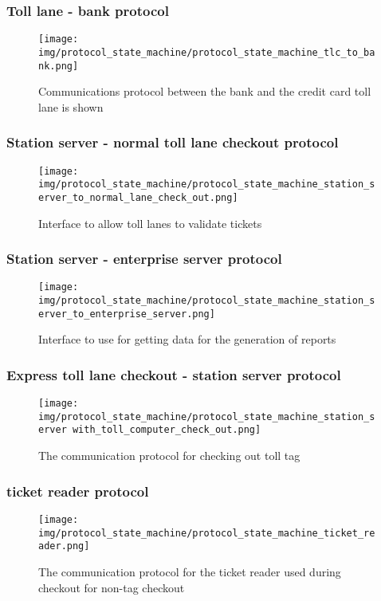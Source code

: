 \subsubsection*{Toll lane - bank protocol}
\begin{figure}
\centering
\texttt{[image: img/protocol\_state\_machine/protocol\_state\_machine\_tlc\_to\_bank.png]}
\caption{Communications protocol between the bank and the credit card toll lane is shown}
\label{fig:protocol_state_machine_tlc_to_bank}
\end{figure}

\subsubsection*{Station server - normal toll lane checkout protocol}
\begin{figure}
\centering
\texttt{[image: img/protocol\_state\_machine/protocol\_state\_machine\_station\_server\_to\_normal\_lane\_check\_out.png]}
\caption{Interface to allow toll lanes to validate tickets}
\label{fig:protocol_state_machine_station_server_to_normal_lane_check_out}
\end{figure}

\subsubsection*{Station server - enterprise server protocol}
\begin{figure}
\centering
\texttt{[image: img/protocol\_state\_machine/protocol\_state\_machine\_station\_server\_to\_enterprise\_server.png]}
\caption{Interface to use for getting data for the generation of reports}
\label{fig:protocol_state_machine_station_server_to_enterprise_server}
\end{figure}

\subsubsection*{Express toll lane checkout - station server protocol}
\begin{figure}
\centering
\texttt{[image: img/protocol\_state\_machine/protocol\_state\_machine\_station\_server with\_toll\_computer\_check\_out.png]}
\caption{The communication protocol for checking out toll tag}
\label{fig:protocol_state_machine_station_server with_toll_computer_check_out}
\end{figure}

\subsubsection*{ticket reader protocol}
\begin{figure}
\centering
\texttt{[image: img/protocol\_state\_machine/protocol\_state\_machine\_ticket\_reader.png]}
\caption{The communication protocol for the ticket reader used during checkout for non-tag checkout}
\label{fig:protocol_state_machine_ticket_reader}
\end{figure}

